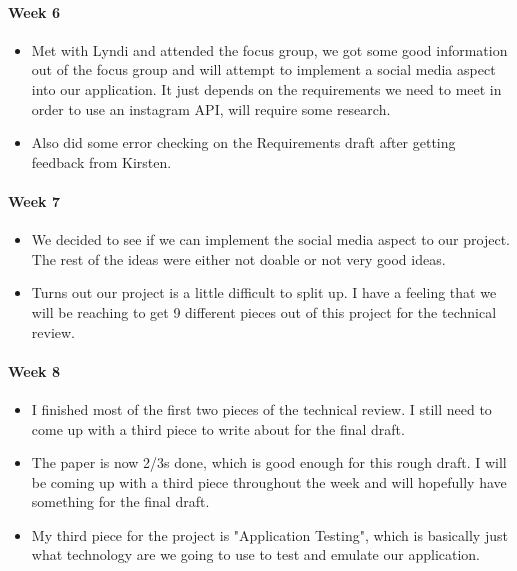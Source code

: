 \documentclass[onecolumn, draftclsnofoot,10pt, compsoc]{IEEEtran}
\begin{document}
      \paragraph{Week 6}
        \begin{itemize}
          \item Met with Lyndi and attended the focus group, we got some good information out of the focus group and will attempt to implement a social media aspect into our application. It just depends on the requirements we need to meet in order to use an instagram API, will require some research.
          \item Also did some error checking on the Requirements draft after getting feedback from Kirsten.
        \end{itemize}

      \paragraph{Week 7}
        \begin{itemize}
          \item We decided to see if we can implement the social media aspect to our project. The rest of the ideas were either not doable or not very good ideas.
          \item Turns out our project is a little difficult to split up. I have a feeling that we will be reaching to get 9 different pieces out of this project for the technical review.
        \end{itemize}

      \paragraph{Week 8}
        \begin{itemize}
          \item I finished most of the first two pieces of the technical review. I still need to come up with a third piece to write about for the final draft.
          \item The paper is now 2/3s done, which is good enough for this rough draft. I will be coming up with a third piece throughout the week and will hopefully have something for the final draft.
          \item My third piece for the project is "Application Testing", which is basically just what technology are we going to use to test and emulate our application.
        \end{itemize}
\end{document}
